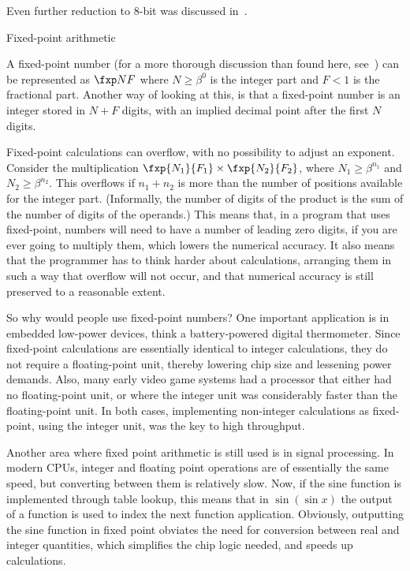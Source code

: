 Even further reduction to 8-bit was discussed in~\cite{dettmers:8bit}.

 {Fixed-point arithmetic}

A fixed-point number (for a more thorough discussion than found here,
see~\cite{YatesFixedPoint}) can be represented as $\fxp NF$ where
$N\geq\beta^0$ is the integer part and $F<1$ is the fractional
part. Another way of looking at this, is that a fixed-point number is
an integer stored in $N+F$ digits, with an implied decimal point after
the first $N$ digits.

Fixed-point calculations can overflow, with no possibility to adjust
an exponent. Consider the multiplication $\fxp{N_1}{F_1}\times
\fxp{N_2}{F_2}$, where $N_1\geq \beta^{n_1}$ and $N_2\geq
\beta^{n_2}$. This overflows if $n_1+n_2$ is more than the number of
positions available for the integer part. (Informally, the number of
digits of the product is the sum of the number of digits of the operands.)
This means that, in a program
that uses fixed-point, numbers will need to have a number of
leading zero digits, if you are ever going to multiply them, 
which lowers the numerical accuracy.
It also means that the programmer has to think harder about
calculations, arranging them in such a way that overflow will not
occur, and that numerical accuracy is still preserved to a reasonable
extent.

So why would people use fixed-point numbers? One important application
is in embedded low-power devices, think a battery-powered digital
thermometer. Since fixed-point calculations are essentially identical
to integer calculations, they do not require a floating-point unit,
thereby lowering chip size and lessening power demands. Also, many
early video game systems had a processor that either had no
floating-point unit, or where the integer unit was considerably faster
than the floating-point unit. In both cases, implementing non-integer
calculations as fixed-point, using the integer unit, was the key to
high throughput. 

Another area where fixed point arithmetic is still used is in signal
processing. In modern CPUs, integer and floating point operations
are of essentially the same speed, but converting between them is
relatively slow. Now, if the sine function is implemented through
table lookup, this means that in $\sin(\sin x)$ 
the output of a function is used to index the next function
application. Obviously, outputting the sine function in fixed point
obviates the need for conversion between real and integer quantities,
which simplifies the chip logic needed, and speeds up calculations.

